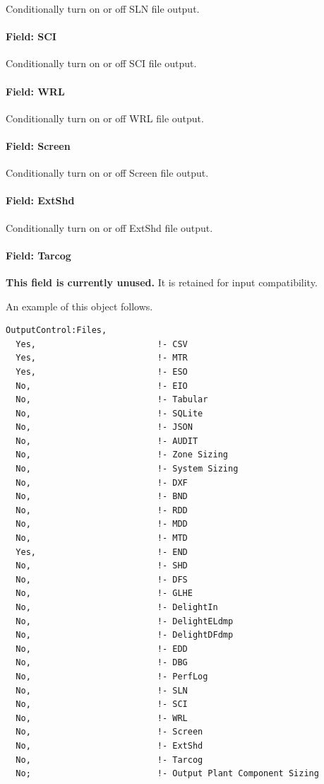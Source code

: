 Conditionally turn on or off SLN file output.

\paragraph{Field: SCI}\label{field-sci}

Conditionally turn on or off SCI file output.

\paragraph{Field: WRL}\label{field-wrl}

Conditionally turn on or off WRL file output.

\paragraph{Field: Screen}\label{field-screen}

Conditionally turn on or off Screen file output.

\paragraph{Field: ExtShd}\label{field-ext-shd}

Conditionally turn on or off ExtShd file output.

\paragraph{Field: Tarcog}\label{field-tarcog}

\textbf{This field is currently unused.} It is retained for input compatibility.

An example of this object follows.

\begin{lstlisting}
OutputControl:Files,
  Yes,                        !- CSV
  Yes,                        !- MTR
  Yes,                        !- ESO
  No,                         !- EIO
  No,                         !- Tabular
  No,                         !- SQLite
  No,                         !- JSON
  No,                         !- AUDIT
  No,                         !- Zone Sizing
  No,                         !- System Sizing
  No,                         !- DXF
  No,                         !- BND
  No,                         !- RDD
  No,                         !- MDD
  No,                         !- MTD
  Yes,                        !- END
  No,                         !- SHD
  No,                         !- DFS
  No,                         !- GLHE
  No,                         !- DelightIn
  No,                         !- DelightELdmp
  No,                         !- DelightDFdmp
  No,                         !- EDD
  No,                         !- DBG
  No,                         !- PerfLog
  No,                         !- SLN
  No,                         !- SCI
  No,                         !- WRL
  No,                         !- Screen
  No,                         !- ExtShd
  No,                         !- Tarcog
  No;                         !- Output Plant Component Sizing
\end{lstlisting}


